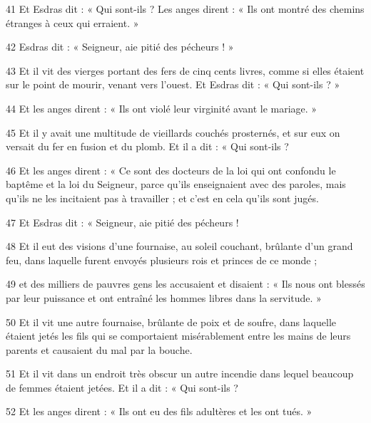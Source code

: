 \par 41 Et Esdras dit : « Qui sont-ils ? Les anges dirent : « Ils ont montré des chemins étranges à ceux qui erraient. »

\par 42 Esdras dit : « Seigneur, aie pitié des pécheurs ! »

\par 43 Et il vit des vierges portant des fers de cinq cents livres, comme si elles étaient sur le point de mourir, venant vers l'ouest. Et Esdras dit : « Qui sont-ils ? »

\par 44 Et les anges dirent : « Ils ont violé leur virginité avant le mariage. »

\par 45 Et il y avait une multitude de vieillards couchés prosternés, et sur eux on versait du fer en fusion et du plomb. Et il a dit : « Qui sont-ils ?

\par 46 Et les anges dirent : « Ce sont des docteurs de la loi qui ont confondu le baptême et la loi du Seigneur, parce qu'ils enseignaient avec des paroles, mais qu'ils ne les incitaient pas à travailler ; et c’est en cela qu’ils sont jugés.

\par 47 Et Esdras dit : « Seigneur, aie pitié des pécheurs !

\par 48 Et il eut des visions d'une fournaise, au soleil couchant, brûlante d'un grand feu, dans laquelle furent envoyés plusieurs rois et princes de ce monde ;

\par 49 et des milliers de pauvres gens les accusaient et disaient : « Ils nous ont blessés par leur puissance et ont entraîné les hommes libres dans la servitude. »

\par 50 Et il vit une autre fournaise, brûlante de poix et de soufre, dans laquelle étaient jetés les fils qui se comportaient misérablement entre les mains de leurs parents et causaient du mal par la bouche.

\par 51 Et il vit dans un endroit très obscur un autre incendie dans lequel beaucoup de femmes étaient jetées. Et il a dit : « Qui sont-ils ?

\par 52 Et les anges dirent : « Ils ont eu des fils adultères et les ont tués. »

